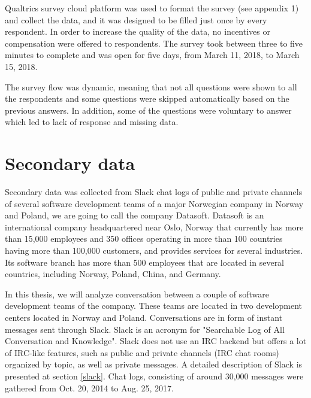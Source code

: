 Qualtrics survey cloud platform was used to format the survey (see appendix 1) and collect the data, and it was designed to be filled just once by every respondent. In order to increase the quality of the data, no incentives or compensation were offered to respondents.  The survey took between three to five minutes to complete and was open for five days, from March 11, 2018, to March 15, 2018.

The survey flow was dynamic, meaning that not all questions were shown to all the respondents and some questions were skipped automatically based on the previous answers. In addition, some of the questions were voluntary to answer which led to lack of response and missing data.

\section{Secondary data}
Secondary data was collected from Slack chat logs of public and private channels of several software development teams of a major Norwegian company in Norway and Poland, we are going to call the company Datasoft.
Datasoft is an international company headquartered near Oslo, Norway that currently has more than 15,000 employees and 350 offices operating in more than 100 countries having more than 100,000 customers, and provides services for several industries. Its software branch has more than 500 employees that are located in several countries, including Norway, Poland, China, and Germany. 

In this thesis, we will analyze conversation between a couple of software development teams of the company. These teams are located in two development centers located in Norway and Poland. Conversations are in form of instant messages sent through Slack. Slack is an acronym for "Searchable Log of All Conversation and Knowledge". Slack does not use an IRC backend but offers a lot of IRC-like features, such as public and private channels (IRC chat rooms) organized by topic, as well as private messages. A detailed description of Slack is presented at section \ref{slack}.
Chat logs, consisting of around 30,000 messages were gathered from Oct. 20, 2014 to Aug. 25, 2017.




